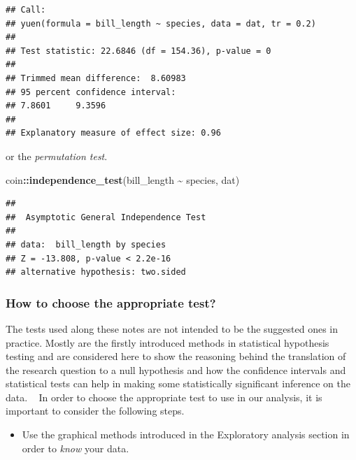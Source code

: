 \documentclass[
]{article}
\newenvironment{Shaded}{\begin{snugshade}}{\end{snugshade}}
\newcommand{\FunctionTok}[1]{\textcolor[rgb]{0.13,0.29,0.53}{\textbf{#1}}}
\newcommand{\NormalTok}[1]{#1}
\newcommand{\SpecialCharTok}[1]{\textcolor[rgb]{0.81,0.36,0.00}{\textbf{#1}}}
\providecommand{\tightlist}{%
  \setlength{\itemsep}{0pt}\setlength{\parskip}{0pt}}
\begin{document}
\begin{verbatim}
## Call:
## yuen(formula = bill_length ~ species, data = dat, tr = 0.2)
## 
## Test statistic: 22.6846 (df = 154.36), p-value = 0
## 
## Trimmed mean difference:  8.60983 
## 95 percent confidence interval:
## 7.8601     9.3596 
## 
## Explanatory measure of effect size: 0.96
\end{verbatim}

or the \emph{permutation test}.

\begin{Shaded}
\begin{Highlighting}[]
\NormalTok{coin}\SpecialCharTok{::}\FunctionTok{independence\_test}\NormalTok{(bill\_length }\SpecialCharTok{\textasciitilde{}}\NormalTok{ species, dat)}
\end{Highlighting}
\end{Shaded}

\begin{verbatim}
## 
##  Asymptotic General Independence Test
## 
## data:  bill_length by species
## Z = -13.808, p-value < 2.2e-16
## alternative hypothesis: two.sided
\end{verbatim}

\hypertarget{how-to-choose-the-appropriate-test}{%
\subsubsection{How to choose the appropriate
test?}\label{how-to-choose-the-appropriate-test}}

The tests used along these notes are not intended to be the suggested
ones in practice. Mostly are the firstly introduced methods in
statistical hypothesis testing and are considered here to show the
reasoning behind the translation of the research question to a null
hypothesis and how the confidence intervals and statistical tests can
help in making some statistically significant inference on the data. ~
In order to choose the appropriate test to use in our analysis, it is
important to consider the following steps.

\begin{itemize}
\tightlist
\item
  Use the graphical methods introduced in the Exploratory analysis
  section in order to \emph{know} your data.
\end{itemize}
\end{document}
